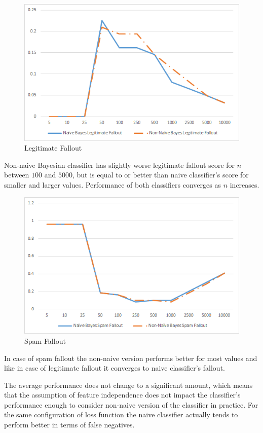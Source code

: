 \documentclass[12pt]{report}
\begin{document}
\begin{figure}[ht!]
	\centering
	\includegraphics[width=120mm]{LegitimateFallout.png}
	\caption{Legitimate Fallout}
	\label{LegitimateFalloutGraph}
\end{figure}

Non-naive Bayesian classifier has slightly worse legitimate fallout score for $n$ between $100$ and $5000$, but is equal to or better than naive classifier's score for smaller and larger values. Performance of both classifiers converges as $n$ increases.

\begin{figure}[ht!]
	\centering
	\includegraphics[width=120mm]{SpamFallout.png}
	\caption{Spam Fallout}
	\label{SpamFalloutGraph}
\end{figure}

In case of spam fallout the non-naive version performs better for most values and like in case of legitimate fallout it converges to naive classifier's fallout.

The average performance does not change to a significant amount, which means that the assumption of feature independence does not impact the classifier's performance enough to consider non-naive version of the classifier in practice. For the same configuration of loss function the naive classifier actually tends to perform better in terms of false negatives.
\end{document}
